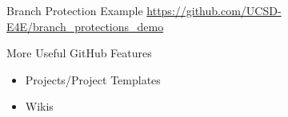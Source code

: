 \documentclass[aspectratio=169]{beamer}
\begin{document}
\begin{frame}{Branch Protection Example}
    \url{https://github.com/UCSD-E4E/branch_protections_demo}
\end{frame}
\begin{frame}{More Useful GitHub Features}
    \begin{itemize}
        \item Projects/Project Templates
        \item Wikis
    \end{itemize}
\end{frame}
\end{document}
